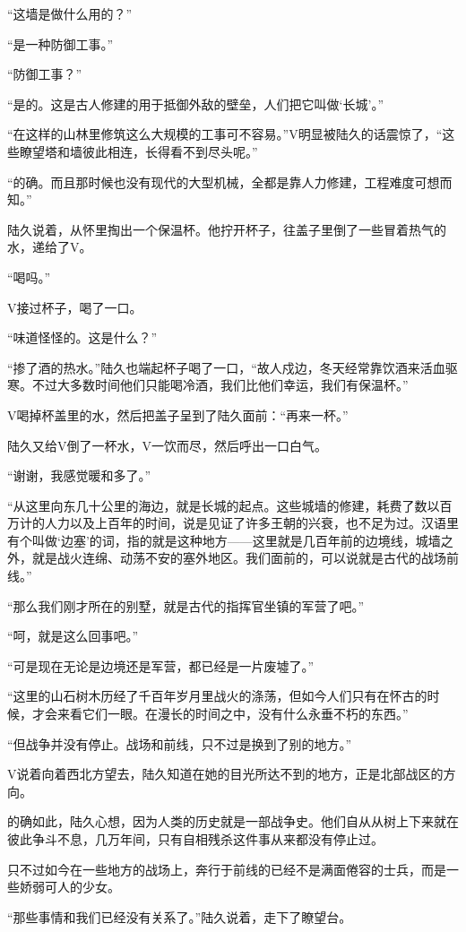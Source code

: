 “这墙是做什么用的？”

“是一种防御工事。”

“防御工事？”

“是的。这是古人修建的用于抵御外敌的壁垒，人们把它叫做‘长城’。”

“在这样的山林里修筑这么大规模的工事可不容易。”V明显被陆久的话震惊了，“这些瞭望塔和墙彼此相连，长得看不到尽头呢。”

“的确。而且那时候也没有现代的大型机械，全都是靠人力修建，工程难度可想而知。”

陆久说着，从怀里掏出一个保温杯。他拧开杯子，往盖子里倒了一些冒着热气的水，递给了V。

“喝吗。”

V接过杯子，喝了一口。

“味道怪怪的。这是什么？”

“掺了酒的热水。”陆久也端起杯子喝了一口，“故人戍边，冬天经常靠饮酒来活血驱寒。不过大多数时间他们只能喝冷酒，我们比他们幸运，我们有保温杯。”

V喝掉杯盖里的水，然后把盖子呈到了陆久面前：“再来一杯。”

陆久又给V倒了一杯水，V一饮而尽，然后呼出一口白气。

“谢谢，我感觉暖和多了。”

“从这里向东几十公里的海边，就是长城的起点。这些城墙的修建，耗费了数以百万计的人力以及上百年的时间，说是见证了许多王朝的兴衰，也不足为过。汉语里有个叫做‘边塞’的词，指的就是这种地方——这里就是几百年前的边境线，城墙之外，就是战火连绵、动荡不安的塞外地区。我们面前的，可以说就是古代的战场前线。”

“那么我们刚才所在的别墅，就是古代的指挥官坐镇的军营了吧。”

“呵，就是这么回事吧。”

“可是现在无论是边境还是军营，都已经是一片废墟了。”

“这里的山石树木历经了千百年岁月里战火的涤荡，但如今人们只有在怀古的时候，才会来看它们一眼。在漫长的时间之中，没有什么永垂不朽的东西。”

“但战争并没有停止。战场和前线，只不过是换到了别的地方。”

V说着向着西北方望去，陆久知道在她的目光所达不到的地方，正是北部战区的方向。

的确如此，陆久心想，因为人类的历史就是一部战争史。他们自从从树上下来就在彼此争斗不息，几万年间，只有自相残杀这件事从来都没有停止过。

只不过如今在一些地方的战场上，奔行于前线的已经不是满面倦容的士兵，而是一些娇弱可人的少女。

“那些事情和我们已经没有关系了。”陆久说着，走下了瞭望台。

